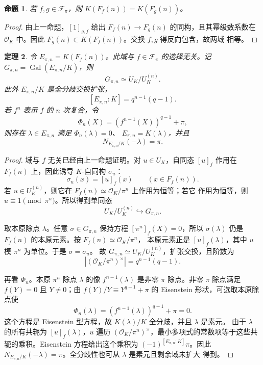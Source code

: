 \documentclass[11pt,a4paper,openany]{ctexbook}
\numberwithin{equation}{chapter}
\newcommand{\Gal}{\operatorname{Gal}}
\theoremstyle{plain}
\newtheorem{theorem}{定理}[chapter]
\newtheorem{proposition}[theorem]{命题}
\theoremstyle{definition}
\theoremstyle{remark}
\begin{document}
\begin{proposition}
若 $f,g\in\mathcal F_\pi$，则 $K(F_f(n))=K(F_g(n))$。
\end{proposition}

\begin{proof}
由上一命题，$[1]_{g,f}$ 给出 $F_f(n)\to F_g(n)$ 的同构，且其幂级数系数在
$\mathcal O_K$ 中。因此 $F_g(n)\subset K(F_f(n))$。交换 $f,g$ 得反向包含，故两域
相等。
\end{proof}

\begin{theorem}
令 $E_{\pi,n}=K(F_f(n))$。此域与 $f\in\mathcal F_\pi$ 的选择无关。记
$G_{\pi,n}=\Gal(E_{\pi,n}/K)$，则
\[
G_{\pi,n}\simeq U_K/U_K^{(n)}.
\]
此外 $E_{\pi,n}/K$ 是全分歧交换扩张，
\[
[E_{\pi,n}:K]=q^{n-1}(q-1).
\]
若 $f^n$ 表示 $f$ 的 $n$ 次复合，令
\[
\Phi_n(X)=(f^{n-1}(X))^{q-1}+\pi,
\]
则存在 $\lambda\in E_{\pi,n}$ 满足 $\Phi_n(\lambda)=0$、
$E_{\pi,n}=K(\lambda)$，并且
\[
N_{E_{\pi,n}/K}(-\lambda)=\pi.
\]
\end{theorem}

\begin{proof}
域与 $f$ 无关已经由上一命题证明。对 $u\in U_K$，自同态 $[u]_f$ 作用在
$F_f(n)$ 上，因此诱导 $K$-自同构 $\sigma_u$：
\[
\sigma_u(x)=[u]_f(x)\qquad(x\in F_f(n)).
\]
若 $u\in U_K^{(n)}$，则它在 $F_f(n)\simeq\mathcal O_K/\pi^n$ 上作用为恒等；若它
作用为恒等，则 $u\equiv1\pmod{\pi^n}$。所以得到单同态
\[
U_K/U_K^{(n)}\hookrightarrow G_{\pi,n}.
\]

取本原除点 $\lambda$。任意 $\sigma\in G_{\pi,n}$ 保持方程 $[\pi^n]_f(X)=0$，所以
$\sigma(\lambda)$ 仍是 $F_f(n)$ 的本原元素。按 $F_f(n)\simeq\mathcal O_K/\pi^n$，
本原元素正是 $[u]_f(\lambda)$，其中 $u$ 模 $\pi^n$ 为单位。于是 $\sigma=\sigma_u$。
故 $G_{\pi,n}\simeq U_K/U_K^{(n)}$，扩张交换，且阶数为
\[
|(\mathcal O_K/\pi^n)^\times|=q^{n-1}(q-1).
\]

再看 $\Phi_n$。本原 $\pi^n$ 除点 $\lambda$ 的像 $f^{n-1}(\lambda)$ 是非零
$\pi$ 除点。非零 $\pi$ 除点满足 $f(Y)=0$ 且 $Y\ne0$；由
$f(Y)/Y\equiv Y^{q-1}+\pi$ 的 Eisenstein 形状，可选取本原除点使
\[
\Phi_n(\lambda)=(f^{n-1}(\lambda))^{q-1}+\pi=0.
\]
这个方程是 Eisenstein 型方程，故 $K(\lambda)/K$ 全分歧，并且 $\lambda$ 是素元。
由于 $\lambda$ 的所有共轭为 $[u]_f(\lambda)$，$u$ 遍历
$(\mathcal O_K/\pi^n)^\times$，最小多项式的常数项等于这些共轭的乘积。Eisenstein
方程给出这个乘积为 $(-1)^{[E_{\pi,n}:K]}\pi$。因此
$N_{E_{\pi,n}/K}(-\lambda)=\pi$。全分歧性也可从 $\lambda$ 是素元且剩余域未扩大
得到。
\end{proof}
\end{document}
